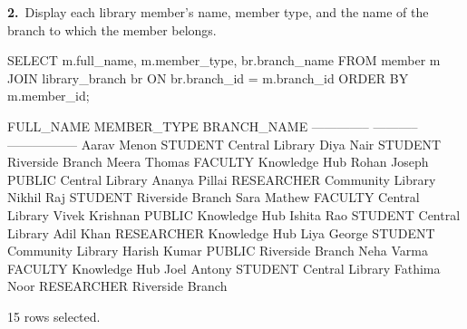\noindent\begin{minipage}{\linewidth}
\begingroup{}
{\fontsize{14}{17}\selectfont\textbf{2.}}\ Display each library member's name, member type, and the name of the branch to which the member belongs.\par
\endgroup\vspace{12pt}


\begin{sqlcode}
SELECT m.full_name, m.member_type, br.branch_name
FROM member m
JOIN library_branch br ON br.branch_id = m.branch_id
ORDER BY m.member_id;
\end{sqlcode}

\vspace{18pt}


\begin{sqlout}[fontsize=\small]
FULL_NAME       MEMBER_TYPE  BRANCH_NAME      
--------------  -----------  -----------------
Aarav Menon     STUDENT      Central Library
Diya Nair       STUDENT      Riverside Branch
Meera Thomas    FACULTY      Knowledge Hub
Rohan Joseph    PUBLIC       Central Library
Ananya Pillai   RESEARCHER   Community Library
Nikhil Raj      STUDENT      Riverside Branch
Sara Mathew     FACULTY      Central Library
Vivek Krishnan  PUBLIC       Knowledge Hub
Ishita Rao      STUDENT      Central Library
Adil Khan       RESEARCHER   Knowledge Hub
Liya George     STUDENT      Community Library
Harish Kumar    PUBLIC       Riverside Branch
Neha Varma      FACULTY      Knowledge Hub
Joel Antony     STUDENT      Central Library
Fathima Noor    RESEARCHER   Riverside Branch

15 rows selected.
\end{sqlout}
\end{minipage}\par\vspace{24pt}

